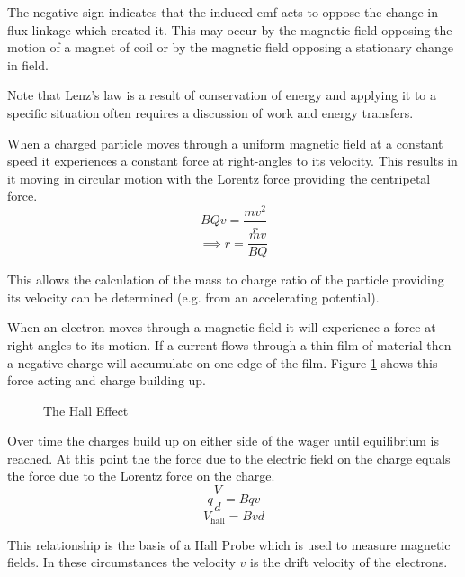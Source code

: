 \documentclass[main.tex]{subfiles}
\begin{document}
 The negative sign indicates that the induced emf acts to oppose the change in flux linkage which created it. This may occur by the magnetic field opposing the motion of a magnet of coil or by the magnetic field opposing a stationary change in field.
 
 Note that Lenz's law is a result of conservation of energy and applying it to a specific situation often requires a discussion of work and energy transfers.


When a charged particle moves through a uniform magnetic field at a constant speed it experiences a constant force at right-angles to its velocity. This results in it moving in circular motion with the Lorentz force providing the centripetal force.
\[ BQv = \frac{mv^2}{r} \]
\[\implies r = \frac{mv}{BQ} \]

This allows the calculation of the mass to charge ratio of the particle providing its velocity can be determined (e.g. from an accelerating potential).

\newpage
{}

When an electron moves through a magnetic field it will experience a force at right-angles to its motion. If a current flows through a thin film of material then a negative charge will accumulate on one edge of the film. Figure \ref{halleffect} shows this force acting and charge building up.

\begin{figure}[h]
  \begin{center}
  \end{center}
  \caption{The Hall Effect}
  \label{halleffect}
\end{figure}

Over time the charges build up on either side of the wager until equilibrium is reached. At this point the the force due to the electric field on the charge equals the force due to the Lorentz force on the charge.
$$ q\frac{V}{d} = Bqv $$
$$ V_\text{hall} = Bvd $$

This relationship is the basis of a Hall Probe which is used to measure magnetic fields. In these circumstances the velocity $v$ is the drift velocity of the electrons.
\end{document}
